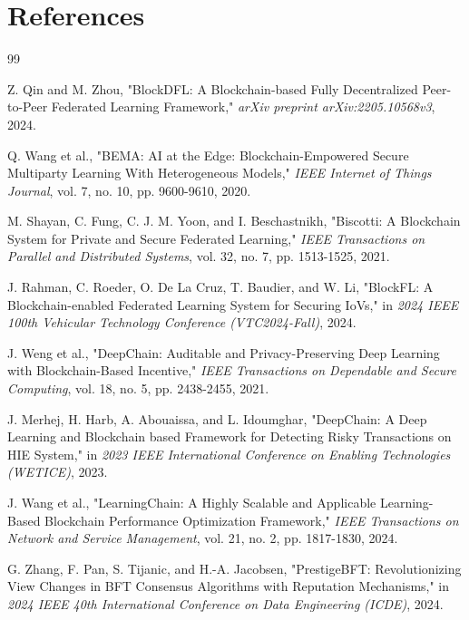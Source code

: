 \clearpage{\pagestyle{empty}\cleardoublepage}
\renewcommand{\chaptername}{Chapter}
\chapter*{References}\label{ref}

\begin{thebibliography}{99}

 Z. Qin and M. Zhou, "BlockDFL: A Blockchain-based Fully Decentralized Peer-to-Peer Federated Learning Framework," \textit{arXiv preprint arXiv:2205.10568v3}, 2024.

 Q. Wang et al., "BEMA: AI at the Edge: Blockchain-Empowered Secure Multiparty Learning With Heterogeneous Models," \textit{IEEE Internet of Things Journal}, vol. 7, no. 10, pp. 9600-9610, 2020.

 M. Shayan, C. Fung, C. J. M. Yoon, and I. Beschastnikh, "Biscotti: A Blockchain System for Private and Secure Federated Learning," \textit{IEEE Transactions on Parallel and Distributed Systems}, vol. 32, no. 7, pp. 1513-1525, 2021.

 J. Rahman, C. Roeder, O. De La Cruz, T. Baudier, and W. Li, "BlockFL: A Blockchain-enabled Federated Learning System for Securing IoVs," in \textit{2024 IEEE 100th Vehicular Technology Conference (VTC2024-Fall)}, 2024.

 J. Weng et al., "DeepChain: Auditable and Privacy-Preserving Deep Learning with Blockchain-Based Incentive," \textit{IEEE Transactions on Dependable and Secure Computing}, vol. 18, no. 5, pp. 2438-2455, 2021.

 J. Merhej, H. Harb, A. Abouaissa, and L. Idoumghar, "DeepChain: A Deep Learning and Blockchain based Framework for Detecting Risky Transactions on HIE System," in \textit{2023 IEEE International Conference on Enabling Technologies (WETICE)}, 2023.

 J. Wang et al., "LearningChain: A Highly Scalable and Applicable Learning-Based Blockchain Performance Optimization Framework," \textit{IEEE Transactions on Network and Service Management}, vol. 21, no. 2, pp. 1817-1830, 2024.

 G. Zhang, F. Pan, S. Tijanic, and H.-A. Jacobsen, "PrestigeBFT: Revolutionizing View Changes in BFT Consensus Algorithms with Reputation Mechanisms," in \textit{2024 IEEE 40th International Conference on Data Engineering (ICDE)}, 2024.


\end{thebibliography}
